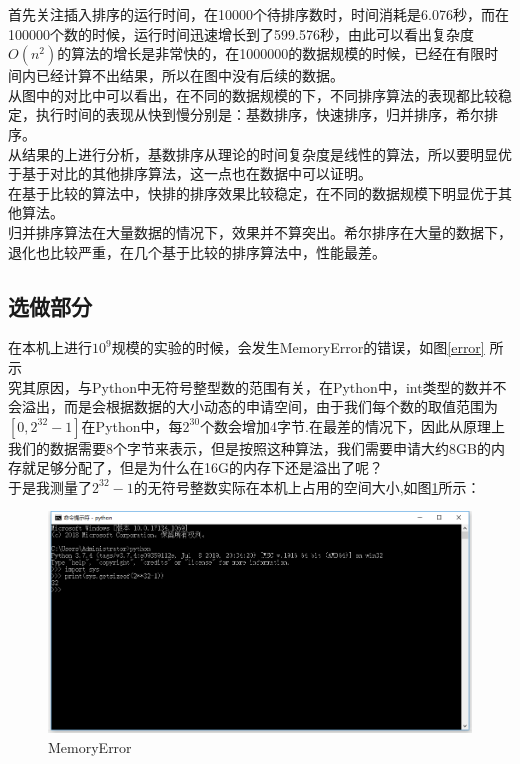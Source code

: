 \documentclass[UTF8]{ctexart}
\begin{document}
首先关注插入排序的运行时间，在10000个待排序数时，时间消耗是6.076秒，而在100000个数的时候，运行时间迅速增长到了599.576秒，由此可以看出复杂度$O(n^2)$的算法的增长是非常快的，在1000000的数据规模的时候，已经在有限时间内已经计算不出结果，所以在图中没有后续的数据。\\

从图中的对比中可以看出，在不同的数据规模的下，不同排序算法的表现都比较稳定，执行时间的表现从快到慢分别是：基数排序，快速排序，归并排序，希尔排序。\\
从结果的上进行分析，基数排序从理论的时间复杂度是线性的算法，所以要明显优于基于对比的其他排序算法，这一点也在数据中可以证明。\\
在基于比较的算法中，快排的排序效果比较稳定，在不同的数据规模下明显优于其他算法。\\
归并排序算法在大量数据的情况下，效果并不算突出。希尔排序在大量的数据下，退化也比较严重，在几个基于比较的排序算法中，性能最差。

\subsection{选做部分}

在本机上进行$10^9$规模的实验的时候，会发生MemoryError的错误，如图\ref{error} 所示\\

究其原因，与Python中无符号整型数的范围有关，在Python中，int类型的数并不会溢出，而是会根据数据的大小动态的申请空间，由于我们每个数的取值范围为$[0,2^{32}-1]$在Python中，每$2^{30}$个数会增加4字节.在最差的情况下，因此从原理上我们的数据需要8个字节来表示，但是按照这种算法，我们需要申请大约8GB的内存就足够分配了，但是为什么在16G的内存下还是溢出了呢？\\

于是我测量了$2^{32}-1$的无符号整数实际在本机上占用的空间大小,如图\ref{size}所示：

\begin{figure}[H]
    \centering
    \includegraphics[width=1\textwidth]{img/size.png}
    \caption{MemoryError}
    \label{size}
\end{figure}
\end{document}
